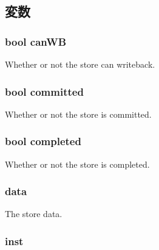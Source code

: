 \subsection{変数}
\hypertarget{structOzoneLWLSQ_1_1SQEntry_a2e445065a38a8a82256decf088cd3e6d}{
\subsubsection[{canWB}]{\setlength{\rightskip}{0pt plus 5cm}bool {\bf canWB}}}
\label{structOzoneLWLSQ_1_1SQEntry_a2e445065a38a8a82256decf088cd3e6d}
Whether or not the store can writeback. \hypertarget{structOzoneLWLSQ_1_1SQEntry_a28712f511a3687635fff96e084fdab9a}{
\subsubsection[{committed}]{\setlength{\rightskip}{0pt plus 5cm}bool {\bf committed}}}
\label{structOzoneLWLSQ_1_1SQEntry_a28712f511a3687635fff96e084fdab9a}
Whether or not the store is committed. \hypertarget{structOzoneLWLSQ_1_1SQEntry_a8c06e370b709d689e392a4b7b53b47c5}{
\subsubsection[{completed}]{\setlength{\rightskip}{0pt plus 5cm}bool {\bf completed}}}
\label{structOzoneLWLSQ_1_1SQEntry_a8c06e370b709d689e392a4b7b53b47c5}
Whether or not the store is completed. \hypertarget{structOzoneLWLSQ_1_1SQEntry_a075dba7fb6badd5634e3d6f7da55c239}{
\subsubsection[{data}]{ {\bf data}}}
\label{structOzoneLWLSQ_1_1SQEntry_a075dba7fb6badd5634e3d6f7da55c239}
The store data. \hypertarget{structOzoneLWLSQ_1_1SQEntry_af5d4fb974eeb4507d4c837d365d0cefc}{
\subsubsection[{inst}]{ {\bf inst}}}
